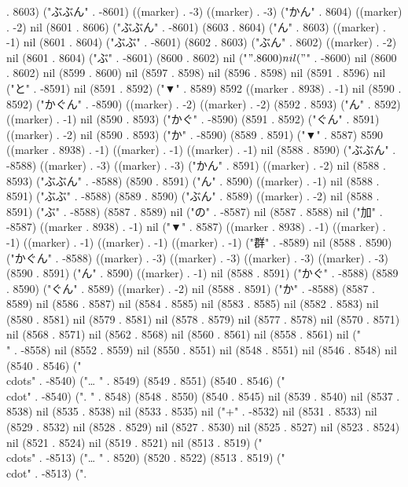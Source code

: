 . 8603) ("ぶぶん" . -8601) ((marker) . -3) ((marker) . -3) ("かん" . 8604) ((marker) . -2) nil (8601 . 8606) ("ぶぶん" . -8601) (8603 . 8604) ("ん" . 8603) ((marker) . -1) nil (8601 . 8604) ("ぶぶ" . -8601) (8602 . 8603) ("ぶん" . 8602) ((marker) . -2) nil (8601 . 8604) ("ぶ" . -8601) (8600 . 8602) nil ("$" . 8600) nil ("$" . -8600) nil (8600 . 8602) nil (8599 . 8600) nil (8597 . 8598) nil (8596 . 8598) nil (8591 . 8596) nil ("と" . -8591) nil (8591 . 8592) ("▼" . 8589) 8592 ((marker . 8938) . -1) nil (8590 . 8592) ("かぐん" . -8590) ((marker) . -2) ((marker) . -2) (8592 . 8593) ("ん" . 8592) ((marker) . -1) nil (8590 . 8593) ("かぐ" . -8590) (8591 . 8592) ("ぐん" . 8591) ((marker) . -2) nil (8590 . 8593) ("か" . -8590) (8589 . 8591) ("▼" . 8587) 8590 ((marker . 8938) . -1) ((marker) . -1) ((marker) . -1) nil (8588 . 8590) ("ぶぶん" . -8588) ((marker) . -3) ((marker) . -3) ("かん" . 8591) ((marker) . -2) nil (8588 . 8593) ("ぶぶん" . -8588) (8590 . 8591) ("ん" . 8590) ((marker) . -1) nil (8588 . 8591) ("ぶぶ" . -8588) (8589 . 8590) ("ぶん" . 8589) ((marker) . -2) nil (8588 . 8591) ("ぶ" . -8588) (8587 . 8589) nil ("の" . -8587) nil (8587 . 8588) nil ("加" . -8587) ((marker . 8938) . -1) nil ("▼" . 8587) ((marker . 8938) . -1) ((marker) . -1) ((marker) . -1) ((marker) . -1) ((marker) . -1) ("群" . -8589) nil (8588 . 8590) ("かぐん" . -8588) ((marker) . -3) ((marker) . -3) ((marker) . -3) ((marker) . -3) (8590 . 8591) ("ん" . 8590) ((marker) . -1) nil (8588 . 8591) ("かぐ" . -8588) (8589 . 8590) ("ぐん" . 8589) ((marker) . -2) nil (8588 . 8591) ("か" . -8588) (8587 . 8589) nil (8586 . 8587) nil (8584 . 8585) nil (8583 . 8585) nil (8582 . 8583) nil (8580 . 8581) nil (8579 . 8581) nil (8578 . 8579) nil (8577 . 8578) nil (8570 . 8571) nil (8568 . 8571) nil (8562 . 8568) nil (8560 . 8561) nil (8558 . 8561) nil ("\\" . -8558) nil (8552 . 8559) nil (8550 . 8551) nil (8548 . 8551) nil (8546 . 8548) nil (8540 . 8546) ("\\cdots" . -8540) ("…
" . 8549) (8549 . 8551) (8540 . 8546) ("\\cdot" . -8540) (".
" . 8548) (8548 . 8550) (8540 . 8545) nil (8539 . 8540) nil (8537 . 8538) nil (8535 . 8538) nil (8533 . 8535) nil ("+" . -8532) nil (8531 . 8533) nil (8529 . 8532) nil (8528 . 8529) nil (8527 . 8530) nil (8525 . 8527) nil (8523 . 8524) nil (8521 . 8524) nil (8519 . 8521) nil (8513 . 8519) ("\\cdots" . -8513) ("…
" . 8520) (8520 . 8522) (8513 . 8519) ("\\cdot" . -8513) (".
